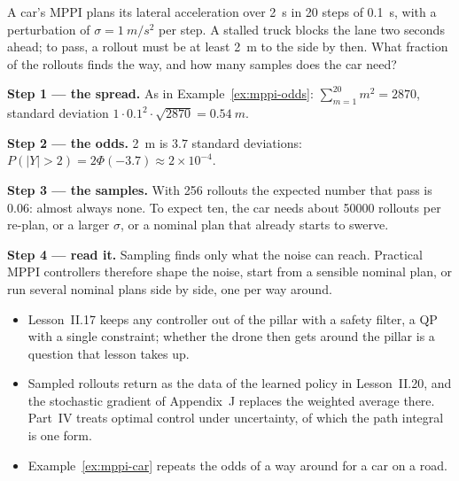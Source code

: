 \begin{example}
\label{ex:mppi-car}
A car's MPPI plans its lateral acceleration over \SI{2}{s} in 20 steps of \SI{0.1}{s}, with a perturbation of $\sigma = \SI{1}{m/s^2}$ per step. A stalled truck blocks the lane two seconds ahead; to pass, a rollout must be at least \SI{2}{m} to the side by then. What fraction of the rollouts finds the way, and how many samples does the car need?

\textbf{Step 1 — the spread.} As in Example~\ref{ex:mppi-odds}: $\sum_{m=1}^{20}m^2 = 2870$, standard deviation $1 \cdot 0.1^2 \cdot \sqrt{2870} = \SI{0.54}{m}$.

\textbf{Step 2 — the odds.} \SI{2}{m} is $3.7$ standard deviations: $P(|Y| > 2) = 2\Phi(-3.7) \approx 2 \times 10^{-4}$.

\textbf{Step 3 — the samples.} With 256 rollouts the expected number that pass is 0.06: almost always none. To expect ten, the car needs about \num{50000} rollouts per re-plan, or a larger $\sigma$, or a nominal plan that already starts to swerve.

\textbf{Step 4 — read it.} Sampling finds only what the noise can reach. Practical MPPI controllers therefore shape the noise, start from a sensible nominal plan, or run several nominal plans side by side, one per way around.
\end{example}

\begin{lookahead}
\begin{itemize}[leftmargin=1.2em]
  \item Lesson~II.17 keeps any controller out of the pillar with a safety filter, a QP with a single constraint; whether the drone then gets around the pillar is a question that lesson takes up.
  \item Sampled rollouts return as the data of the learned policy in Lesson~II.20, and the stochastic gradient of Appendix~J replaces the weighted average there. Part~IV treats optimal control under uncertainty, of which the path integral is one form.
  \item Example~\ref{ex:mppi-car} repeats the odds of a way around for a car on a road.
\end{itemize}
\end{lookahead}

